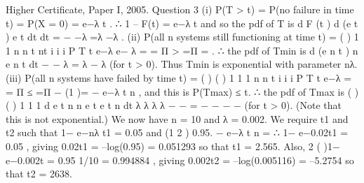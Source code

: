 Higher Certificate, Paper I, 2005. Question 3
(i) P(T > t) = P(no failure in time t) = P(X = 0) = e−λ t .
∴ 1 – F(t) = e−λ t and so the pdf of T is d F (t ) d (e t ) e t
dt dt
= − −λ =λ −λ .
(ii) P(all n systems still functioning at time t) = ( )
1 1
n n
t nt
i
i i
P T t e−λ e− λ
= =
Π > =Π = .
∴ the pdf of Tmin is d (e n t ) n e n t
dt
− − λ = λ − λ (for t > 0).
Thus Tmin is exponential with parameter nλ.
(iii) P(all n systems have failed by time t) = ( ) ( )
1 1
1
n n
t
i
i i
P T t e−λ
= =
Π ≤ =Π −
(1 )= − e−λ t n , and this is P(Tmax) ≤ t.
∴ the pdf of Tmax is {( ) } ( ) 1 1 1 d e t n n e t e t n
dt
λ λ λ λ − − = − − − − (for t > 0).
(Note that this is not exponential.)
We now have n = 10 and λ = 0.002. We require t1 and t2 such that 1− e−nλ t1 = 0.05
and (1 2 ) 0.95. − e−λ t n =
∴ 1− e−0.02t1 = 0.05 , giving 0.02t1 = –log(0.95) = 0.051293 so that t1 = 2.565.
Also, 2 ( )1− e−0.002t = 0.95 1/10 = 0.994884 , giving 0.002t2 = –log(0.005116) = –5.2754
so that t2 = 2638.
